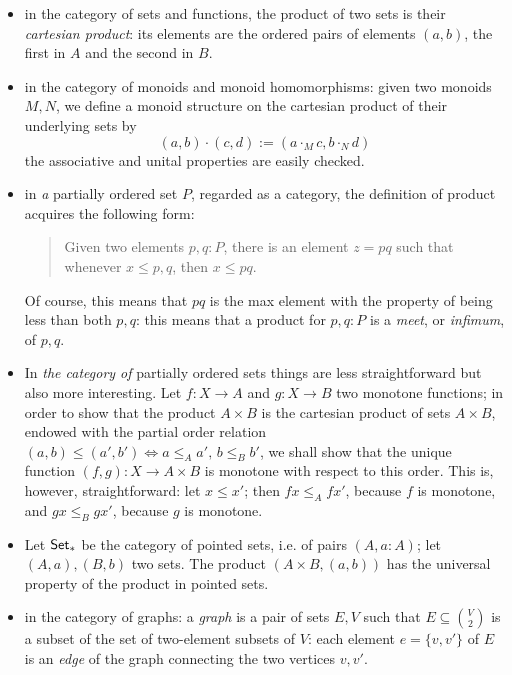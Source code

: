 \documentclass[11pt]{article}
\begin{document}
\begin{itemize}
	\item in the category of sets and functions, the product of two sets is their \emph{cartesian product}: its elements are the ordered pairs of elements $(a,b)$, the first in $A$ and the second in $B$.
	\item in the category of monoids and monoid homomorphisms: given two monoids $M,N$, we define a monoid structure on the cartesian product of their underlying sets by
	      \[
		      (a,b) \cdot (c,d) := (a \cdot_M c, b\cdot_N d)
				\] the associative and unital properties are easily checked.
	\item in \emph{a} partially ordered set $P$, regarded as a category, the definition of product acquires the following form:
	      \begin{quote}
		      Given two elements $p,q : P$, there is an element $z = pq$ such that whenever $x\le p,q$, then $x\le pq$.
	      \end{quote}
	      Of course, this means that $pq$ is the max element with the property of being less than both $p,q$: this means that a product for $p,q : P$ is a \emph{meet}, or \emph{infimum}, of $p,q$.
	\item In \emph{the category of} partially ordered sets things are less straightforward but also more interesting. Let $f : X \to A$ and $g : X \to B$ two monotone functions; in order to show that the product $A\times B$ is the cartesian product of sets $A\times B$, endowed with the partial order relation $(a,b)\le (a',b') \iff a \le_A a',\, b\le_B b'$, we shall show that the unique function $(f,g) : X \to A\times B$ is monotone with respect to this order. This is, however, straightforward: let $x\le x'$; then $fx\le_A fx'$, because $f$ is monotone, and $gx\le_B gx'$, because $g$ is monotone.
	\item Let ${\sf Set}_*$ be the category of pointed sets, i.e. of pairs $(A,a :A)$; let $(A,a), (B,b)$ two sets. The product $(A\times B, (a,b))$ has the universal property of the product in pointed sets.
	\item in the category of graphs: a \emph{graph} is a pair of sets $E,V$ such that $E\subseteq \binom{V}{2}$ is a subset of the set of two-element subsets of $V$: each element $e=\{v,v'\}$ of $E$ is an \emph{edge} of the graph connecting the two vertices $v,v'$.

\end{itemize}
\end{document}
